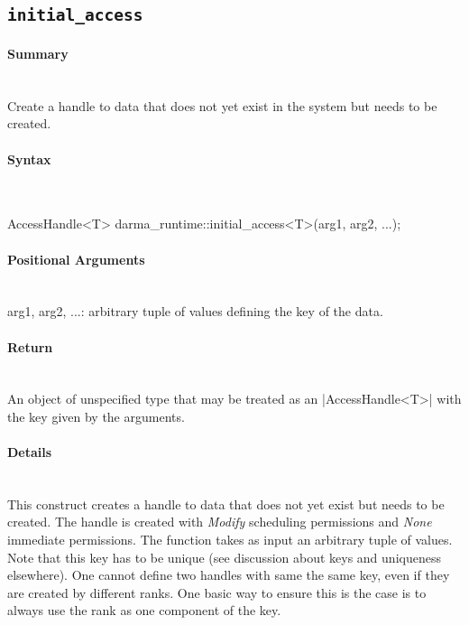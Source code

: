 \subsection{\texttt{initial\_access}}

\paragraph{Summary}\mbox{}\\ 
Create a handle to data that does not yet exist in the system 
but needs to be created.

\paragraph{Syntax}\mbox{}\\ 
\begin{CppCode}
AccessHandle<T> darma_runtime::initial_access<T>(arg1, arg2, ...);
\end{CppCode}

\paragraph{Positional Arguments}\mbox{}\\ 
arg1, arg2, ...: arbitrary tuple of values defining the key of the data.

\paragraph{Return}\mbox{}\\ 
An object of unspecified type that may be treated as an |AccessHandle<T>|
with the key given by the arguments.

\paragraph{Details}\mbox{}\\ 
This construct creates a handle to data that does not yet 
exist but needs to be created.  The handle is created with {\it Modify}
scheduling permissions and {\it None} immediate permissions.  The function takes
as input an arbitrary tuple of values.
Note that this key has to be unique (see discussion about keys and uniqueness
elsewhere).  One cannot define two
handles with same the same key, even if they are created by different ranks.
One basic way to ensure this is the case is to always use the rank 
as one component of the key. 

